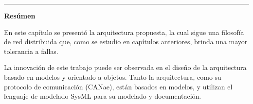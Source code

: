 

\vspace{1cm}
\noindent\rule{\textwidth}{2pt}

\textbf{\Large{Resúmen}}

En este capítulo se presentó la arquitectura propuesta, la cual 
sigue una filosofía de red distribuida que, como se estudio en
capítulos anteriores, brinda una mayor tolerancia a fallas.

La innovación de este trabajo puede ser observada en el diseño de
la arquitectura basado en modelos y orientado a objetos. Tanto la
arquitectura, como su protocolo de comunicación (CANae),
están basados en modelos, y utilizan el lenguaje de modelado SysML para su
modelado y documentación. 
